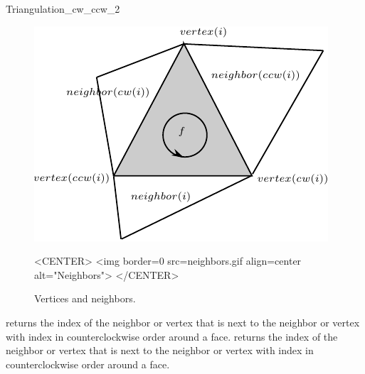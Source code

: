 \begin{ccRefClass}{Triangulation_cw_ccw_2}
 \begin{figure}
\begin{ccTexOnly}
    \begin{center}
     \includegraphics{Triangulation_2/neighbors}
    \end{center}
\end{ccTexOnly} 
    \caption{Vertices and neighbors.
    \label{Triangulation_ref_Fig_neighbors_bis}}
  \begin{ccHtmlOnly}
<CENTER>
<img border=0 src=neighbors.gif align=center alt="Neighbors">
</CENTER>
\end{ccHtmlOnly} 
\end{figure}




\ccCreation
{}  %


\ccOperations
{}
{returns the index of the  neighbor or vertex that is  next to 
the neighbor or vertex with index 
in counterclockwise order around a face.}
\ccGlue
{}
{returns the index of the  neighbor or vertex that is  next to 
the neighbor or vertex with index 
in counterclockwise order around a face.}

\ccSeeAlso
{} \\
 \\

\end{ccRefClass}


